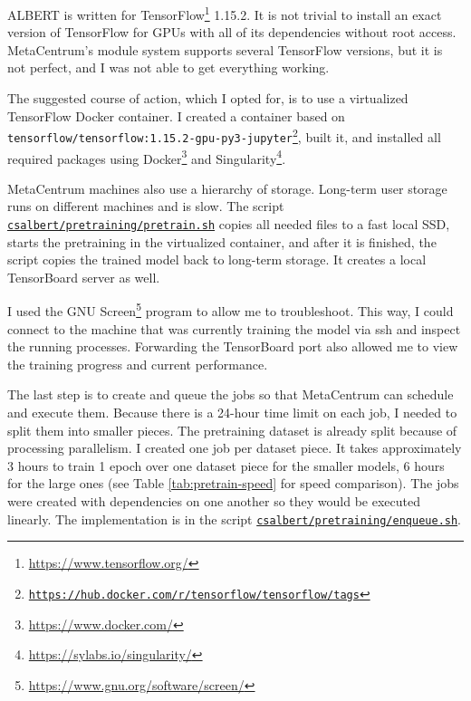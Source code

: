 \documentclass[
  printed, %
  color,   %
  table,   %
  oneside, %
  lof,     %
  lot,     %
]{fithesis3}
\begin{document}
\vspace{1em}
{\parindent=0cm
ALBERT is written for TensorFlow\footnote{\url{https://www.tensorflow.org/}} 1.15.2. It is not trivial to install an exact version of TensorFlow for GPUs with all of its dependencies without root access. MetaCentrum's module system supports several TensorFlow versions, but it is not perfect, and I was not able to get everything working. 
}

The suggested course of action, which I opted for, is to use a virtualized TensorFlow Docker container. I created a container based on \texttt{tensorflow/tensorflow:1.15.2-gpu-py3-jupyter}\footnote{
\href{https://hub.docker.com/layers/tensorflow/tensorflow/1.15.2-gpu-py3-jupyter/images/sha256-2c2ddc9780724ee528757f44beb16dac302a09ee7eb4e333b7dd85404597fdd9}
    {\texttt{https://hub.docker.com/r/tensorflow/tensorflow/tags}}
}, built it, and installed all required packages using Docker\footnote{\url{https://www.docker.com/}} and Singularity\footnote{\url{https://sylabs.io/singularity/}}.

MetaCentrum machines also use a hierarchy of storage. Long-term user storage runs on different machines and is slow. The script \href{https://github.com/ZepZep/csalbert/blob/master/pretraining/pretrain.sh}{\texttt{csalbert/pretraining/pretrain.sh}} copies all needed files to a fast local SSD, starts the pretraining in the virtualized container, and after it is finished, the script copies the trained model back to long-term storage. It creates a local TensorBoard server as well. 

I used the GNU Screen\footnote{\url{https://www.gnu.org/software/screen/}} program to allow me to troubleshoot. This way, I could connect to the machine that was currently training the model via ssh and inspect the running processes. Forwarding the TensorBoard port also allowed me to view the training progress and current performance.

The last step is to create and queue the jobs so that MetaCentrum can schedule and execute them. Because there is a 24-hour time limit on each job, I needed to split them into smaller pieces. The pretraining dataset is already split because of processing parallelism. I created one job per dataset piece. It takes approximately 3 hours to train 1 epoch over one dataset piece for the smaller models, 6 hours for the large ones (see Table \ref{tab:pretrain-speed} for speed comparison). The jobs were created with dependencies on one another so they would be executed linearly. The implementation is in the script \href{https://github.com/ZepZep/csalbert/blob/master/pretraining/enqueue.sh}{\texttt{csalbert/pretraining/enqueue.sh}}.
\end{document}
